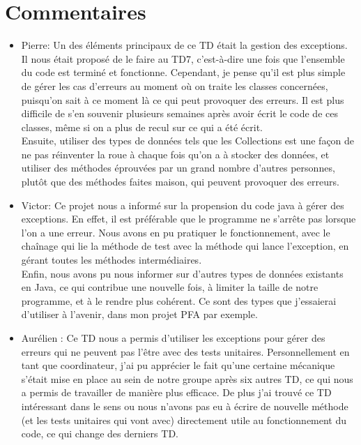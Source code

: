 \documentclass[a4paper,11pt]{article}
\begin{document}
\section{Commentaires}

\begin{itemize}
\item Pierre: Un des éléments principaux de ce TD était la gestion des exceptions. Il nous était proposé de le faire au TD7, c'est-à-dire une fois que l'ensemble du code est terminé et fonctionne. Cependant, je pense qu'il est plus simple de gérer les cas d'erreurs au moment où on traite les classes concernées, puisqu'on sait à ce moment là ce qui peut provoquer des erreurs. Il est plus difficile de s'en souvenir plusieurs semaines après avoir écrit le code de ces classes, même si on a plus de recul sur ce qui a été écrit.\\
Ensuite, utiliser des types de données tels que les Collections est une façon de ne pas réinventer la roue à chaque fois qu'on a à stocker des données, et utiliser des méthodes éprouvées par un grand nombre d'autres personnes, plutôt que des méthodes faites maison, qui peuvent provoquer des erreurs.\\

\item Victor: Ce projet nous a informé sur la propension du code java à gérer des exceptions. En effet, il est préférable que le programme ne s'arrête pas lorsque l'on a une erreur. Nous avons en pu pratiquer le fonctionnement, avec le chaînage qui lie la méthode de test avec la méthode qui lance l'exception, en gérant toutes les méthodes intermédiaires. \\
Enfin, nous avons pu nous informer sur d'autres types de données existants en Java, ce qui contribue une nouvelle fois, à limiter la taille de notre programme, et à le rendre plus cohérent. Ce sont des types que j'essaierai d'utiliser à l'avenir, dans mon projet PFA par exemple.\\

\item Aurélien : Ce TD nous a permis d'utiliser les exceptions pour gérer des erreurs qui ne peuvent pas l'être avec des tests unitaires. Personnellement en tant que coordinateur, j'ai pu apprécier le fait qu'une certaine mécanique s'était mise en place au sein de notre groupe après six autres TD, ce qui nous a permis de travailler de manière plus efficace. De plus j'ai trouvé ce TD intéressant dans le sens ou nous n'avons pas eu à écrire de nouvelle méthode (et les tests unitaires qui vont avec) directement utile au fonctionnement du code, ce qui change des derniers TD. \\


\end{itemize}
\end{document}
